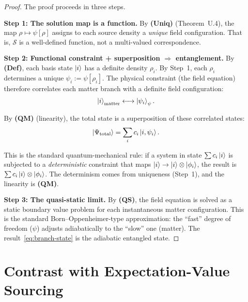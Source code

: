 \documentclass[aps,prd,twocolumn,superscriptaddress,nofootinbib]{revtex4-2}
\begin{document}
\begin{proof}
The proof proceeds in three steps.

\medskip
\noindent\textbf{Step 1: The solution map is a function.}
By \textbf{(Uniq)} (Theorem~U.4), the map $\rho \mapsto \psi[\rho]$
assigns to each source density a \emph{unique} field configuration.
That is, $\mathcal{S}$ is a well-defined function, not a
multi-valued correspondence.

\medskip
\noindent\textbf{Step 2: Functional constraint + superposition $\Rightarrow$ entanglement.}
By \textbf{(Def)}, each basis state $\ket{i}$ has a definite density $\rho_i$.
By Step~1, each $\rho_i$ determines a unique $\psi_i := \psi[\rho_i]$.
The physical constraint (the field equation) therefore correlates each
matter branch with a definite field configuration:
\begin{equation}
\ket{i}_{\mathrm{matter}} \longleftrightarrow \ket{\psi_i}_\psi.
\end{equation}

By \textbf{(QM)} (linearity), the total state is a superposition of
these correlated states:
\begin{equation}
\ket{\Psi_{\mathrm{total}}} = \sum_i c_i \ket{i, \psi_i}.
\end{equation}

This is the standard quantum-mechanical rule: if a system in state
$\sum c_i \ket{i}$ is subjected to a \emph{deterministic} constraint
that maps $\ket{i} \to \ket{i} \otimes \ket{\phi_i}$, the result is
$\sum c_i \ket{i}\otimes\ket{\phi_i}$. The determinism comes from
uniqueness (Step~1), and the linearity is \textbf{(QM)}.

\medskip
\noindent\textbf{Step 3: The quasi-static limit.}
By \textbf{(QS)}, the field equation is solved as a static boundary
value problem for each instantaneous matter configuration. This is the
standard Born--Oppenheimer-type approximation: the ``fast'' degree of
freedom ($\psi$) adjusts adiabatically to the ``slow'' one (matter).
The result~\eqref{eq:branch-state} is the adiabatic entangled state.
\end{proof}

\section{Contrast with Expectation-Value Sourcing}
\end{document}
